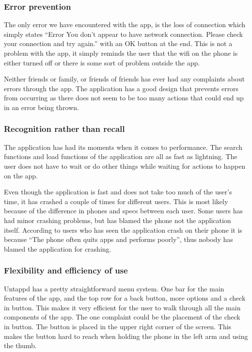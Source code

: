 \documentclass[12pt]{article}
\begin{document}
\subsubsection{Error prevention}
The only error we have encountered with the app, is the loss of connection which
simply states “Error You don’t appear to have network connection. Please check
your connection and try again.” with an OK button at the end. This is not a
problem with the app, it simply reminds the user that the wifi on the phone is
either turned off or there is some sort of problem outside the app. 


Neither friends or family, or friends of friends has ever had any complaints
about errors through the app. The application has a good design that prevents errors
from occurring  as there does not seem to be too many actions that could end up
in an error being thrown. 


\subsubsection{Recognition rather than recall}
The application has had its moments when it comes to performance. The search functions
and load functions of the application are all as fast as lightning. The user does not
have to wait or do other things while waiting for actions to happen on the app. 


Even though the application is fast and does not take too much of the user's time, it
has crashed a couple of times for different users. This is most likely because
of the difference in phones and specs between each user. Some users has had
minor crashing problems, but has blamed the phone not the application itself.
According to users who has seen the application crash on their phone it is because “The
phone often quits apps and performs poorly”, thus nobody has blamed the
application for crashing. 


\subsubsection{Flexibility and efficiency of use}
Untappd has a pretty straightforward menu system. One bar for the main features
of the app, and the top row for a back button, more options and a check in
button. This makes it very efficient for the user to walk through all the main
components of the app. The one complaint could be the placement of the check in
button. The button is placed in the upper right corner of the screen. This makes
the button hard to reach when holding the phone in the left arm and using the
thumb.
\end{document}
